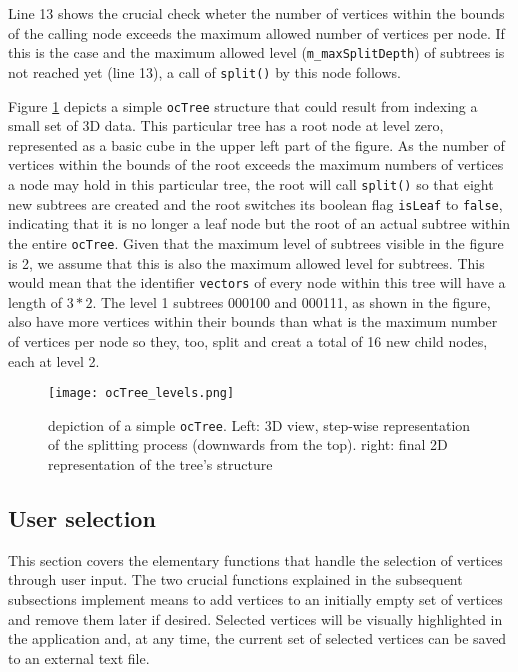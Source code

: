 Line 13 shows the crucial check wheter the number of vertices within the bounds of the calling node exceeds the maximum allowed number of vertices per node. If this is the case and the maximum allowed level (\texttt{m\_maxSplitDepth}) of subtrees is not reached yet (line 13), a call of \texttt{split()} by this node follows.

Figure \ref{fig:ocTree_levels.png} depicts a simple \texttt{ocTree} structure that could result from indexing a small set of 3D data. This particular tree has a root node at level zero, represented as a basic cube in the upper left part of the figure. As the number of vertices within the bounds of the root exceeds the maximum numbers of vertices a node may hold in this particular tree, the root will call \texttt{split()} so that eight new subtrees are created and the root switches its boolean flag \texttt{isLeaf} to \texttt{false}, indicating that it is no longer a leaf node but the root of an actual subtree within the entire \texttt{ocTree}. Given that the maximum level of subtrees visible in the figure is 2, we assume that this is also the maximum allowed level for subtrees. This would mean that the identifier \texttt{vectors} of every node within this tree will have a length of $3*2$. The level 1 subtrees 000100 and 000111, as shown in the figure, also have more vertices within their bounds than what is the maximum number of vertices per node so they, too, split and creat a total of 16 new child nodes, each at level 2.

\begin{figure}[htb]
  \centering
  \texttt{[image: ocTree\_levels.png]}
  \caption{depiction of a simple \texttt{ocTree}. Left: 3D view, step-wise representation of the splitting process (downwards from the top). right: final 2D representation of the tree's structure}\label{fig:ocTree_levels.png}
\end{figure}


\pagebreak %
\subsection{User selection}
\label{sec:user_selection}

This section covers the elementary functions that handle the selection of vertices through user input. The two crucial functions explained in the subsequent subsections implement means to add vertices to an initially empty set of vertices and remove them later if desired. Selected vertices will be visually highlighted in the application and, at any time, the current set of selected vertices can be saved to an external text file.

